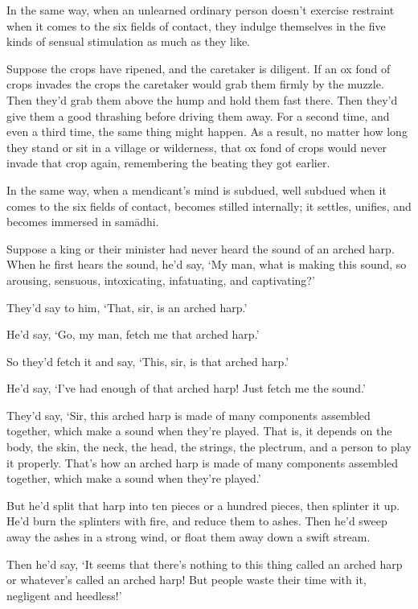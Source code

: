 \documentclass[12pt,openany]{book}%
\begin{document}
In the same way, when an unlearned ordinary person doesn’t exercise restraint when it comes to the six fields of contact, they indulge themselves in the five kinds of sensual stimulation as much as they like. 

Suppose the crops have ripened, and the caretaker is diligent. If an ox fond of crops invades the crops the caretaker would grab them firmly by the muzzle. Then they’d grab them above the hump and hold them fast there. Then they’d give them a good thrashing before driving them away. For a second time, and even a third time, the same thing might happen. As a result, no matter how long they stand or sit in a village or wilderness, that ox fond of crops would never invade that crop again, remembering the beating they got earlier. 

In the same way, when a mendicant’s mind is subdued, well subdued when it comes to the six fields of contact, becomes stilled internally; it settles, unifies, and becomes immersed in \textsanskrit{samādhi}. 

Suppose a king or their minister had never heard the sound of an arched harp. When he first hears the sound, he’d say, ‘My man, what is making this sound, so arousing, sensuous, intoxicating, infatuating, and captivating?’ 

They’d say to him, ‘That, sir, is an arched harp.’ 

He’d say, ‘Go, my man, fetch me that arched harp.’ 

So they’d fetch it and say, ‘This, sir, is that arched harp.’ 

He’d say, ‘I’ve had enough of that arched harp! Just fetch me the sound.’ 

They’d say, ‘Sir, this arched harp is made of many components assembled together, which make a sound when they’re played. That is, it depends on the body, the skin, the neck, the head, the strings, the plectrum, and a person to play it properly. That’s how an arched harp is made of many components assembled together, which make a sound when they’re played.’ 

But he’d split that harp into ten pieces or a hundred pieces, then splinter it up. He’d burn the splinters with fire, and reduce them to ashes. Then he’d sweep away the ashes in a strong wind, or float them away down a swift stream. 

Then he’d say, ‘It seems that there’s nothing to this thing called an arched harp or whatever’s called an arched harp! But people waste their time with it, negligent and heedless!’ 
\end{document}
